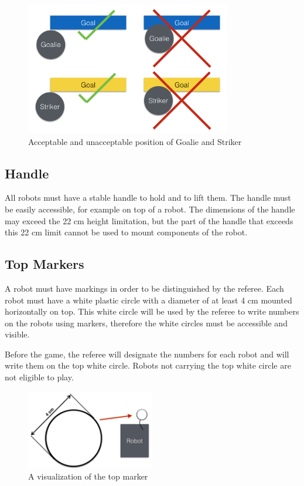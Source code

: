 \documentclass{article}
\begin{document}
\begin{figure}[H]
    \centering
    \includegraphics[width=0.8\textwidth]{media/image3.png}
    \caption{Acceptable and unacceptable position of Goalie and Striker}
    \label{fig:robot_in_goal}
\end{figure}

\subsection{ Handle \label{ref-024}}

All robots must have a stable handle to hold and to lift them. The handle must be easily accessible, for example on top of a robot. The dimensions of the handle may exceed the 22 cm height limitation, but the part of the handle that exceeds this 22 cm limit cannot be used to mount components of the robot.

\subsection{ Top Markers\label{ref-025}}

A robot must have markings in order to be distinguished by the referee. Each robot must have a white plastic circle with a diameter of at least 4 cm mounted horizontally on top. This white circle will be used by the referee to write numbers on the robots using markers, therefore the white circles must be accessible and visible.

Before the game, the referee will designate the numbers for each robot and will write them on the top white circle. Robots not carrying the top white circle are not eligible to play.

\begin{figure}[H]
    \centering
    \includegraphics[width=0.5\textwidth]{media/image4.jpeg}
    \caption{A visualization of the top marker}
    \label{fig:top_marker}
\end{figure}
\end{document}

